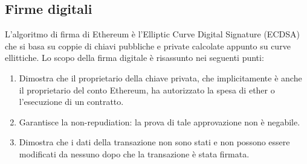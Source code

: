 \subsection*{Firme digitali}
L'algoritmo di firma di Ethereum è l'Elliptic Curve Digital Signature (ECDSA) che si basa su coppie di chiavi pubbliche e private calcolate appunto su curve ellittiche. Lo scopo della firma digitale è risassunto nei seguenti punti:
\begin{enumerate}
	\item Dimostra che il proprietario della chiave privata, che implicitamente è anche il proprietario del conto Ethereum, ha autorizzato la spesa di ether o l'esecuzione di un contratto.
	\item Garantisce la non-repudiation: la prova di tale approvazione non è negabile.
	\item Dimostra che i dati della transazione non sono stati e non possono essere modificati da nessuno dopo che la transazione è stata firmata.
\end{enumerate}

